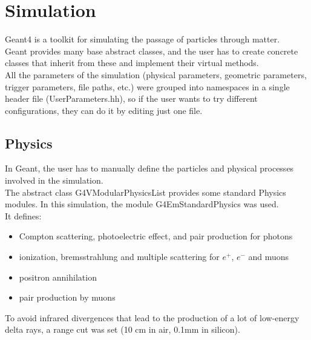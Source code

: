 \documentclass[10pt, a4paper, twocolumn]{article} %
\begin{document}
\section{Simulation}
Geant4 is a toolkit for simulating the passage of particles through matter.
\\
Geant provides many base abstract classes, and the user has to create concrete classes that inherit from these and implement their virtual methods.
\\
All the parameters of the simulation (physical parameters, geometric parameters, trigger parameters, file paths, etc.) were grouped into namespaces in a single header file (UserParameters.hh), so if the user wants to try different configurations, they can do it by editing just one file.

\subsection{Physics}
In Geant, the user has to manually define the particles and physical processes involved in the simulation.
\\
The abstract class G4VModularPhysicsList provides some standard Physics modules. In this simulation, the module G4EmStandardPhysics was used.
\\
It defines:
\begin{itemize}
    \item Compton scattering, photoelectric effect, and pair production for photons
    \item ionization, bremsstrahlung and multiple scattering for $e^+$, $e^-$ and muons
    \item positron annihilation
    \item pair production by muons
\end{itemize}
To avoid infrared divergences that lead to the production of a lot of low-energy delta rays, a range cut was set (10 cm in air, 0.1mm in silicon).
\end{document}

